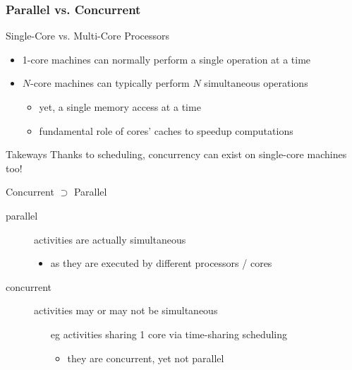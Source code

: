 \documentclass{beamer}\mode<presentation>{\usetheme{AMSBolognaFC}}
\begin{document}
\begin{frame}[allowframebreaks]
    \frametitle{Parallel vs. Concurrent}

    \begin{block}{Single-Core vs. Multi-Core Processors}
        \begin{itemize}
            \item 1-core machines can normally perform a \alert{single operation} at a time
            \item $N$-core machines can typically perform \alert{$N$ simultaneous operations}
            \begin{itemize}
                \item yet, a single memory access at a time
                \item fundamental role of \alert{cores' caches} to speedup computations
            \end{itemize}
        \end{itemize}
    \end{block}

    \begin{alertblock}{Takeways}
        \centering
        Thanks to scheduling, concurrency can exist on single-core machines too!
    \end{alertblock}

    \begin{block}{Concurrent $\supset$ Parallel}
        \begin{description}
            \item[parallel] activities are actually simultaneous
            \begin{itemize}
                \item as they are executed by different processors / cores
            \end{itemize}

            \item[concurrent] activities may or may not be simultaneous
            \begin{itemize}
                \item[eg] activities sharing 1 core via time-sharing scheduling
                \begin{itemize}
                    \item they are concurrent, yet not parallel
                \end{itemize}
            \end{itemize}
        \end{description}
    \end{block}
\end{frame}
\end{document}
